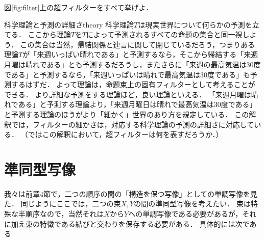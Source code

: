 \documentclass[11pt,a4paper, dvipdfmx]{jsarticle}
\begin{document}
\begin{renshu}{}{}
    図\ref{fig:filter}上の超フィルターをすべて挙げよ．
\end{renshu}

\begin{rei}{科学理論と予測の詳細さ}{theory}
科学理論$T$は現実世界について何らかの予測を立てる．
ここから理論$T$を$T$によって予測されるすべての命題の集合と同一視しよう．
この集合は当然，帰結関係と連言に関して閉じているだろう，つまりある理論$T$が「来週いっぱい晴れである」と予測するなら，そこから帰結する「来週月曜は晴れである」とも予測するだろうし，またさらに「来週の最高気温は30度である」と予測するなら，「来週いっぱいは晴れで最高気温は30度である」も予測するはずだ．
よって理論は，命題束上の固有フィルターとして考えることができる．
より詳細な予測をする理論ほど，良い理論といえる．
「来週月曜は晴れである」と予測する理論より，「来週月曜日は晴れで最高気温は30度である」と予測する理論のほうがより「細かく」世界のあり方を規定している．
この解釈では，フィルターの細かさは，対応する科学理論の予測の詳細さに対応している．
（ではこの解釈において，超フィルターは何を表すだろうか．）
\end{rei}



\section{準同型写像}
我々は前章4節で，二つの順序の間の「構造を保つ写像」としての単調写像を見た．
同じようにここでは，二つの束$X, Y$の間の準同型写像を考えたい．
束は特殊な半順序なので，当然それは$X$から$Y$への単調写像である必要があるが，それに加え束の特徴である結びと交わりを保存する必要がある．
具体的には次である
\end{document}
